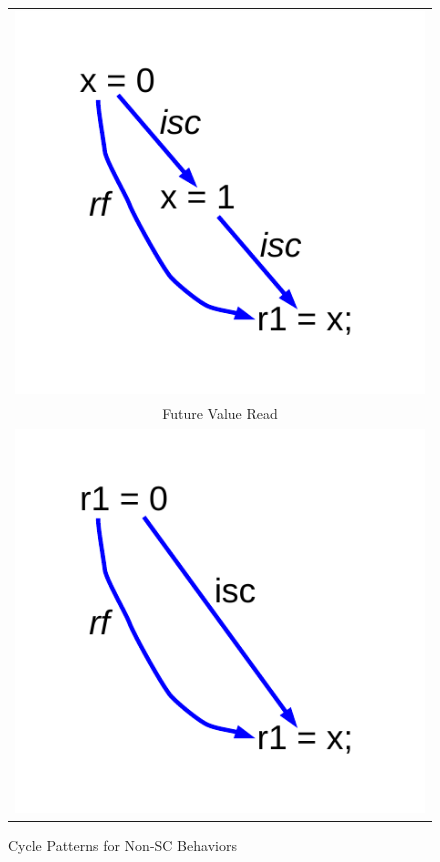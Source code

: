 \begin{figure}[!ht]
\begin{tabular}{c}
\includegraphics[scale=.45]{figures/old_val_isc}\\
\multicolumn{1}{c}{Future Value Read}\\
\includegraphics[scale=.45]{figures/future_val_isc}\\
\end{tabular}
\caption{\label{fig:fence_implications}Cycle Patterns for Non-SC Behaviors}
\end{figure}



